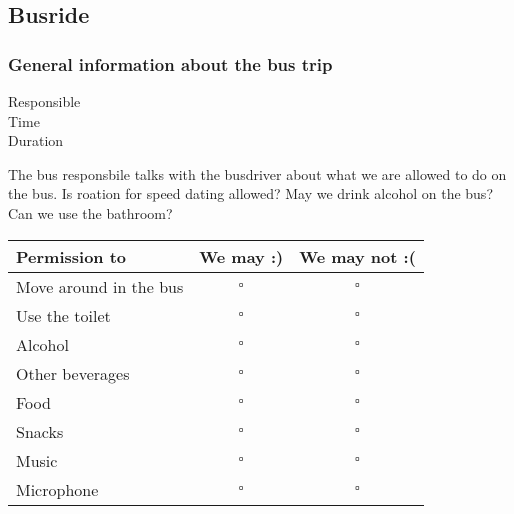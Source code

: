 \documentclass[../../../main.tex]{subfiles}
\begin{document}
\subsection{Busride}

\subsubsection{General information about the bus trip}

\begin{description}
\item[Responsible] \placeholder
\item[Time] \placeholder
\item[Duration] \placeholder
\end{description}

The bus responsbile talks with the busdriver about what we are allowed to do on the bus. Is roation for speed dating allowed? May we drink alcohol on the bus? Can we use the bathroom?


\begin{table}[ht!]
\begin{center}
\begin{tabular}{|l|c|c|}
\hline
\textbf{Permission to}  & \textbf{We may :)}    & \textbf{We may not :(}    \\ \hline
Move around in the bus  & $\square$             &  $\square$                \\ \hline
Use the toilet          & $\square$             &  $\square$                \\ \hline
Alcohol                 & $\square$             &  $\square$                \\ \hline
Other beverages         & $\square$             &  $\square$                \\ \hline
Food                    & $\square$             &  $\square$                \\ \hline
Snacks                  & $\square$             &  $\square$                \\ \hline
Music                   & $\square$             &  $\square$                \\ \hline
Microphone              & $\square$             &  $\square$                \\ \hline
\end{tabular}
\end{center}
\end{table}
\end{document}
